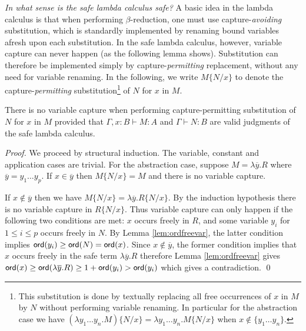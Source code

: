 \documentclass{llncs}
\newcommand\captsubst[2]{\{#1/#2 \}}
\newcommand\ord[1]{{\sf
    ord}(#1)} \newcommand\typear{\rightarrow}
\begin{document}
\emph{In what sense is the safe lambda calculus safe?} A basic idea
in the lambda calculus is that when performing $\beta$-reduction, one
must use capture-\emph{avoiding} substitution, which is standardly
implemented by renaming bound variables afresh upon each substitution.
In the safe lambda calculus, however, variable capture can never
happen (as the following lemma shows). Substitution can therefore be
implemented simply by capture-\emph{permitting} replacement, without
any need for variable renaming. In the following, we write
$M\captsubst{N}{x}$ to denote the capture-\emph{permitting}
substitution\footnote{This substitution is done by
textually replacing all free occurrences of $x$ in $M$ by $N$ without performing variable renaming.  In particular for the abstraction
  case we have 
$(\lambda y_1\ldots y_n . M)\captsubst{N}{x} = \lambda y_1\ldots y_n . M\captsubst{N}{x}$ when $x\not\in
  \{ y_1\ldots y_n \}$.}
of $N$ for $x$ in $M$.

\begin{lemma}\label{lem:nvc}
\label{lem:homog_nocapture} There is
no variable capture when performing capture-permitting
substitution of $N$ for $x$ in $M$
provided that $\Gamma, x:B \vdash M : A$ and $\Gamma \vdash  N : B$ are valid judgments of the safe lambda calculus.
\end{lemma}

\begin{proof}
  We proceed by structural induction. The variable, constant and
  application cases are trivial. For the abstraction case, suppose $M = \lambda \overline{y}. R$ where $\overline{y} = y_1
  \ldots y_p$. If $x \in \overline{y}$ then $M \captsubst{N}{x} = M$ and there is no variable capture.

 If $x \not\in \overline{y}$ then we have $M \captsubst{N}{x} = \lambda \overline{y} . R \captsubst{N}{x}$.  By the induction hypothesis there is no variable capture in $R \captsubst{N}{x}$.  Thus variable capture can only happen if the following two conditions are met: $x$ occurs freely in $R$, and some variable $y_i$ for $1 \leq i \leq p$ occurs freely in $N$. By Lemma \ref{lem:ordfreevar}, the latter condition  implies $\ord{y_i} \geq \ord{N} = \ord{x}$.  Since $x \not \in \overline{y}$, the former condition implies that $x$ occurs freely in the safe term $\lambda \overline{y}. R$
  therefore Lemma \ref{lem:ordfreevar} gives $ \ord{x} \geq
  \ord{\lambda \overline{y} . R} \geq 1+ \ord{y_i} > \ord{y_i}$ which  gives a contradiction. \qed
\end{proof}
\end{document}
